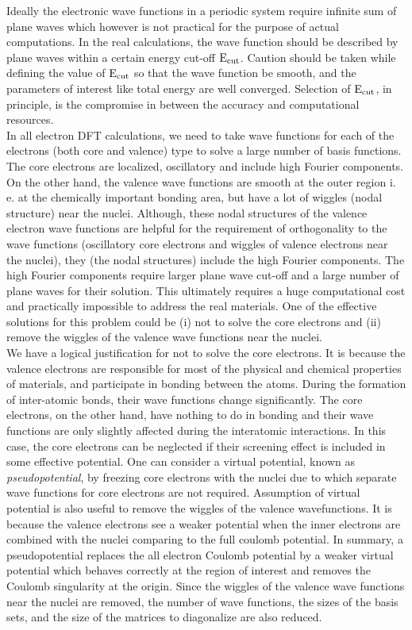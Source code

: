 Ideally the electronic wave functions in a periodic system require infinite sum of plane waves which however is not practical for the purpose of actual computations. In the real calculations, the wave function should be described by plane waves within a certain energy cut-off ${\rm E}_{\rm cut}$. Caution should be taken while defining the value of ${\rm E}_{\rm cut}$ so that the wave function be smooth, and the parameters 
of interest like total energy are well converged. Selection of ${\rm E}_{\rm cut}$, in principle, is the compromise in between the accuracy and computational resources.\\ 
In all electron DFT calculations, we need to take wave functions for each of the electrons (both core and valence) type to solve a large number of basis functions. The core electrons are localized, oscillatory and include high Fourier components. On the other hand, the valence wave functions are smooth at the outer region i. e. at the chemically important bonding area, but have a lot of wiggles (nodal structure) near the nuclei. Although, these nodal structures of the valence electron wave functions are helpful for the requirement of orthogonality to the wave functions (oscillatory core electrons and wiggles of valence electrons near the nuclei), they (the nodal structures) include the high Fourier components. The high Fourier components require larger plane wave cut-off and a large number of plane waves for their solution. This ultimately requires a huge computational cost and practically impossible to address the real materials. One of the effective solutions for this problem could be (i) not to solve the core electrons and (ii) remove the wiggles of the valence wave functions near the nuclei.\\
We have a logical justification for not to solve the core electrons. It is because the valence electrons are responsible for most of the physical and chemical properties of materials, and participate in bonding between the atoms. During the formation of inter-atomic bonds, their wave functions change significantly. The core electrons, on the other hand, have nothing to do in bonding and their wave functions are only slightly affected during the interatomic interactions. In this case, the core electrons can be neglected if their screening effect is included in some effective potential. One can consider a virtual potential, known as {\it pseudopotential}, by freezing core electrons with the nuclei due to which separate wave functions for core electrons are not required. Assumption of virtual potential is also useful to remove the wiggles of the valence wavefunctions. It is because the valence electrons see a weaker potential when the inner electrons are combined with the nuclei comparing to the full coulomb potential. In summary, a pseudopotential replaces the all electron Coulomb potential by a weaker virtual potential which behaves correctly at the region of interest and removes the Coulomb singularity at the origin. Since the wiggles of the valence wave functions near the nuclei are removed, the number of wave functions, the sizes of the basis sets, and the size of the matrices to diagonalize are also reduced.
